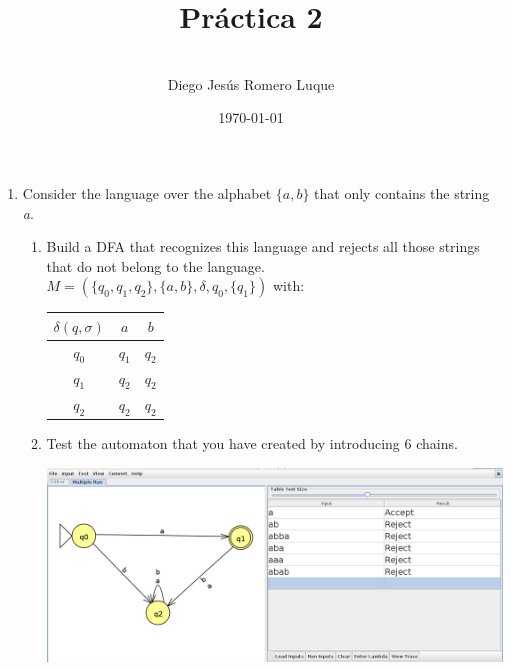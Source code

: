 \documentclass{article}
\title{\textbf{Pr\'actica 2}}
\author{\\Diego Jes\'us Romero Luque}
\date{\today}
\begin{document}
\maketitle
\pagebreak

\begin{enumerate}
    \item Consider the language over the alphabet $\{a,b\}$ that only contains the string \textit{a}.
          \begin{enumerate}
              \item Build a DFA that recognizes this language and rejects all those strings that do not belong to the language.\\
                    $M=(\{q_0,q_1,q_2\}, \{a,b\}, \delta, q_0, \{q_1\})$ with:\\
                    \begin{table}[h!]
                        \begin{tabular}{c|c|c}
                            $\delta(q,\sigma)$ & $a$   & $b$   \\
                            \hline
                            $q_0$              & $q_1$ & $q_2$ \\
                            \hline
                            $q_1$              & $q_2$ & $q_2$ \\
                            \hline
                            $q_2$              & $q_2$ & $q_2$
                        \end{tabular}
                    \end{table}

              \item Test the automaton that you have created by introducing 6 chains.
              
                    \includegraphics[scale=0.5]{Test6Chains}
          \end{enumerate}


\end{enumerate}
\end{document}
